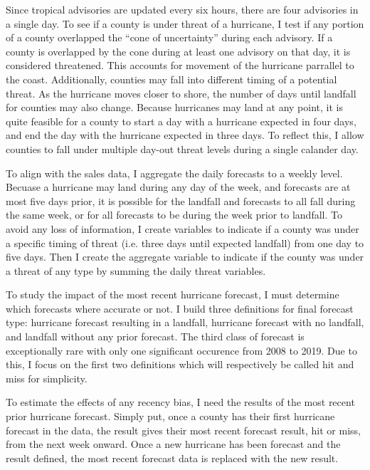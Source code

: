\documentclass{article}
\begin{document}
Since tropical advisories are updated every six hours, there are four advisories in a single day. To see if a county is under threat of a hurricane, I test if any portion of a county overlapped the ``cone of uncertainty'' during each advisory. If a county is overlapped by the cone during at least one advisory on that day, it is considered threatened. This accounts for movement of the hurricane parrallel to the coast. Additionally, counties may fall into different timing of a potential threat. As the hurricane moves closer to shore, the number of days until landfall for counties may also change. Because hurricanes may land at any point, it is quite feasible for a county to start a day with a hurricane expected in four days, and end the day with the hurricane expected in three days. To reflect this, I allow counties to fall under multiple day-out threat levels during a single calander day. 

To align with the sales data, I aggregate the daily forecasts to a weekly level. Becuase a hurricane may land during any day of the week, and forecasts are at most five days prior, it is possible for the landfall and forecasts to all fall during the same week, or for all forecasts to be during the week prior to landfall. To avoid any loss of information, I create variables to indicate if a county was under a specific timing of threat (i.e. three days until expected landfall) from one day to five days. Then I create the aggregate variable to indicate if the county was under a threat of any type by summing the daily threat variables. 

To study the impact of the most recent hurricane forecast, I must determine which forecasts where accurate or not. I build three definitions for final forecast type: hurricane forecast resulting in a landfall, hurricane forecast with no landfall, and landfall without any prior forecast. The third class of forecast is exceptionally rare with only one significant occurence from 2008 to 2019. Due to this, I focus on the first two definitions which will respectively be called hit and miss for simplicity. 

To estimate the effects of any recency bias, I need the results of the most recent prior hurricane forecast. Simply put, once a county has their first hurricane forecast in the data, the result gives their most recent forecast result, hit or miss,  from the next week onward. Once a new hurricane has been forecast and the result defined, the most recent forecast data is replaced with the new result. 
\end{document}
